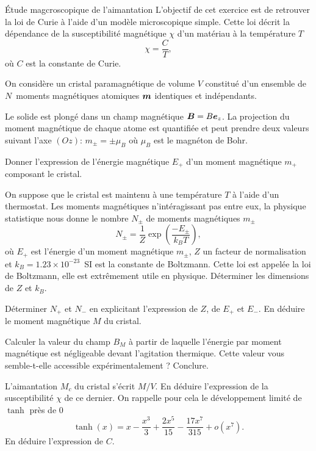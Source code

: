 \begin{td}{Étude magcroscopique de l'aimantation}
	L'objectif de cet exercice est de retrouver la loi de Curie à l'aide
	d'un modèle microscopique simple. Cette loi décrit
	la dépendance de la susceptibilité magnétique $\chi$ d'un matériau à la température
	$T$
	\begin{equation*}
		\chi = \dfrac{C}{T},
	\end{equation*}
	où $C$ est la constante de Curie.

	On considère un cristal paramagnétique de volume $V$ constitué d'un ensemble
	de $N$~moments magnétiques atomiques $\vecm$ identiques et indépendants. 

	Le solide est plongé dans un champ magnétique $\vecb = B \ez$. La projection
	du moment magnétique de chaque atome est quantifiée et peut prendre deux
	valeurs suivant l'axe $(Oz)$: $m_\pm = \pm \mu_B$ où $\mu_B$ est le magnéton de
	Bohr.
	\begin{exlist}
		\item Donner l'expression de l'énergie magnétique $E_+$ d'un moment
		  magnétique $m_+$ composant le cristal. 	
	  	\item On suppose que le cristal est maintenu à une température
		  $T$ à l'aide d'un thermostat. Les moments magnétiques 
		  n'intéragissant pas entre eux, la physique statistique
		  nous donne le nombre $N_\pm$ de moments magnétiques $m_\pm$
		  \begin{equation*}
			  N_\pm = \dfrac{1}{Z} \exp\left(\dfrac{-E_\pm}{k_B T}\right),
		  \end{equation*}
		  où $E_+$ est l'énergie d'un moment magnétique $m_\pm$,
		  $Z$ un facteur de normalisation et 
		  $k_B = 1.23 \times 10^{-23}$\, SI est la constante de Boltzmann.
		  Cette loi est appelée la loi de Boltzmann, elle est 
		  extrêmement utile en physique.
		  Déterminer les dimensions de $Z$ et $k_B$.
		
	  \item Déterminer $N_+$ et $N_-$ en explicitant l'expression de 
	    $Z$, de $E_+$ et $E_-$. En déduire le moment magnétique $M$ 
	    du cristal.
	  \item Calculer la valeur du champ $B_M$ à partir de laquelle l'énergie 
	    par moment magnétique est négligeable devant l'agitation thermique.
	    Cette valeur vous semble-t-elle accessible expérimentalement ?
	    Conclure.
	  \item L'aimantation $M_c$ du cristal s'écrit $M/V$. En déduire l'expression
	    de la susceptibilité $\chi$ de ce dernier.
	    On rappelle pour cela le développement
	    limité de $\tanh$ près de $0$
	    \begin{equation*}
		    \tanh(x) = x -\dfrac{x^3}{3} + \dfrac{2x^5}{15} - 
		    \dfrac{17x^7}{315}+ o(x^7).
	    \end{equation*}
	    En déduire l'expression de $C$.


\end{exlist}
\end{td}
